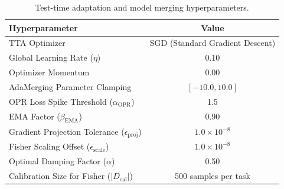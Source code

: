 \documentclass{article}
\theoremstyle{plain}
\theoremstyle{definition}
\theoremstyle{remark}
\begin{document}
\begin{table}[H]
\caption{Test-time adaptation and model merging hyperparameters.}
\label{tab:tta_hyperparams}
\vskip 0.15in
\begin{center}
\begin{small}
\begin{sc}
\begin{tabular}{lc}
\toprule
Hyperparameter & Value \\
\midrule
TTA Optimizer & SGD (Standard Gradient Descent) \\
Global Learning Rate (\(\eta\)) & 0.10 \\
Optimizer Momentum & 0.00 \\
AdaMerging Parameter Clamping & \([-10.0, 10.0]\) \\
OPR Loss Spike Threshold (\(\alpha_{\text{OPR}}\)) & 1.5 \\
EMA Factor (\(\beta_{\text{EMA}}\)) & 0.90 \\
Gradient Projection Tolerance (\(\epsilon_{\text{proj}}\)) & \(1.0 \times 10^{-8}\) \\
Fisher Scaling Offset (\(\epsilon_{\text{scale}}\)) & \(1.0 \times 10^{-8}\) \\
Optimal Damping Factor (\(\alpha\)) & 0.50 \\
Calibration Size for Fisher (\(|D_{\text{cal}}|\)) & 500 samples per task \\
\bottomrule
\end{tabular}
\end{sc}
\end{small}
\nobreak
\end{center}
\vskip -0.1in
\end{table}
\end{document}

